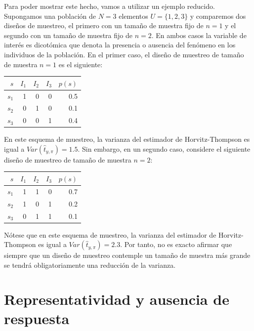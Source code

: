 \documentclass[
  12pt,
  spanish,
]{book}
\begin{document}
Para poder mostrar este hecho, vamos a utilizar un ejemplo reducido. Supongamos una población de \(N = 3\) elementos \(U=\{1, 2, 3\}\) y comparemos dos diseños de muestreo, el primero con un tamaño de muestra fijo de \(n=1\) y el segundo con un tamaño de muestra fijo de \(n=2\). En ambos casos la variable de interés es dicotómica que denota la presencia o ausencia del fenómeno en los individuos de la población. En el primer caso, el diseño de muestreo de tamaño de muestra \(n=1\) es el siguiente:

\begin{longtable}[]{@{}rrrrr@{}}
\toprule
\(s\) & \(I_1\) & \(I_2\) & \(I_3\) & \(p(s)\) \\
\midrule
\endhead
\(s_1\) & 1 & 0 & 0 & 0.5 \\
\(s_2\) & 0 & 1 & 0 & 0.1 \\
\(s_3\) & 0 & 0 & 1 & 0.4 \\
\bottomrule
\end{longtable}

En este esquema de muestreo, la varianza del estimador de Horvitz-Thompson es igual a \(Var(\hat t_{y, \pi}) = 1.5\). Sin embargo, en un segundo caso, considere el siguiente diseño de muestreo de tamaño de muestra \(n=2\):

\begin{longtable}[]{@{}rrrrr@{}}
\toprule
\(s\) & \(I_1\) & \(I_2\) & \(I_3\) & \(p(s)\) \\
\midrule
\endhead
\(s_1\) & 1 & 1 & 0 & 0.7 \\
\(s_2\) & 1 & 0 & 1 & 0.2 \\
\(s_3\) & 0 & 1 & 1 & 0.1 \\
\bottomrule
\end{longtable}

Nótese que en este esquema de muestreo, la varianza del estimador de Horvitz-Thompson es igual a \(Var(\hat t_{y, \pi}) = 2.3\). Por tanto, no es exacto afirmar que siempre que un diseño de muestreo contemple un tamaño de muestra más grande se tendrá obligatoriamente una reducción de la varianza.

\hypertarget{representatividad-y-ausencia-de-respuesta}{%
\chapter{Representatividad y ausencia de respuesta}\label{representatividad-y-ausencia-de-respuesta}}
\end{document}
